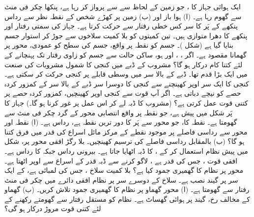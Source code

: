 ایک ہوائی جہاز کا  ، جو زمین کے لحاظ سے  سے پرواز کر رہا ہے، پنکھا  چکر فی منٹ  سے گھوم رہا ہے۔  (ا)  ہوا باز  اور (ب)  زمین پر کھڑے شخص کے نقطہ نظر سے رداس   پنکھے کے   پَر کا سر کس خطی رفتار سے حرکت کرتا ہے۔ جہاز کی سمتی رفتار اور   پنکھے  کا دھرا متوازی ہیں۔
تین کمیتوں  کو بلا کمیت سلاخوں سے جوڑ کر استوار جسم بنایا گیا ہے (شکل )۔ جسم کو نقطہ  پر واقع، جسم کی سطح کو عمودی،  محور پر  گھمانا مقصود ہے۔ اگر ، ، اور  ہو، ساکن حالت سے جسم کو  زاوی رفتار تک پہنچانے کے لئے کتنا کام درکار ہو گا؟
مشروب کے ڈبے میں   کنجی   کا شمول  مشروبات    کی صنعت میں    ایک بڑا قدم تھا۔ ڈبے کے بالا  سر میں  وسطی  قابلے پر کنجی    حرکت کر سکتی ہے۔ کنجی  کا ایک سر اوپر کھینچنے سے  کنجی  کا دوسرا سر ڈبے کے بالا سر کے کمزور کردہ  حصے کو نیچے  دباتی  ہے۔ اگر آپ  قوت سے کنجی  اوپر کھینچیں، کمزور  کردہ حصے پر کتنی قوت عمل کرتی ہے؟ (مشروب  کا ڈبہ لے کر اس عمل پر غور کرنا ہو گا۔)
جہاز کا پَر شکل  میں پیش ہے، جو نقطہ  پر واقع انتصابی محور کے گرد   چکر فی منٹ  سے گھومتا ہے۔ نقطہ  کا، جو   محور سے پَر کا  دور ترین نقطہ ہے، رداس    ہے۔ (ا)  نقطہ  اور محور سے  رداسی فاصلے پر موجود نقطے  کے  مرکز مائل  اسراع کی قدر میں فرق   کتنا ہو گا؟ (ب)   بالمقابل  رداسی فاصلے کی ترسیم کھینچیں۔
بلا رگڑ افقی  محور پر،   شکل  میں پیش نظام استعمال کر کے ،  کا ڈبہ اٹھایا جاتا ہے۔ بیرونی رداس  جبکہ  کا رداس    ہے۔افقی قوت  ، جس کی قدر  ہے  ، لاگو کرنے سے   ڈبہ   قدر کے اسراع  سے اوپر  اٹھتا  ہے۔ محور پر نظام کا گھمیری جمود کیا ہے؟
بلا کمیت سلاخ ، جس کی لمبائی  ہے، کے ایک سر پر  گیند نصب ہے۔  سلاخ کے دوسرے سر پر نظام افقی دائرے میں  چکر فی منٹ رفتار سے گھومتا ہے۔ (ا)  محور گھماو پر نظام کا گھمیری جمود تلاش کریں۔ (ب) گھماو کے مخالف رخ،   گیند پر ہوائی گھساٹ  ہے۔ نظام کو مستقل رفتار سے گھومتے رکھنے کے لئے کتنی قوت مروڑ درکار ہو گی؟

